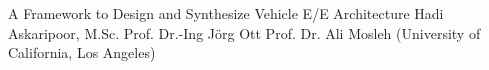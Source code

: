 \documentclass[AIRphdthesis%
              ,optCharter%
              ,optBiber%
              ,optBibstyleAlphabetic%
              ,optCenterEquations%
              ,optEnglish%
              ]{AIRlatex}%
\begin{document}
%
\frontmatter%
\AIRphdthesisTitlePageCustomMaleExaminer%
{A Framework to Design and Synthesize Vehicle E/E Architecture}%
{}%
{Hadi Askaripoor, M.Sc.}%
{\AIRlangPhdDegreeDrRerNat}%
{Prof. Dr.-Ing Jörg Ott}%
{\AIRnamesProfKnoll}%
{Prof. Dr. Ali Mosleh (University of California, Los Angeles) }%
{}%
{}%
%
%

%
\AIRphdthesisPrintTableOfContents%
\listoffigures
\listoftables
\listofalgorithms
\mainmatter%
%
%
%
%
%
%
%
%
%
\appendix%
%
%
{%
    \printbibliography[heading=bibintoc]%
}%
%
%
\end{document}
